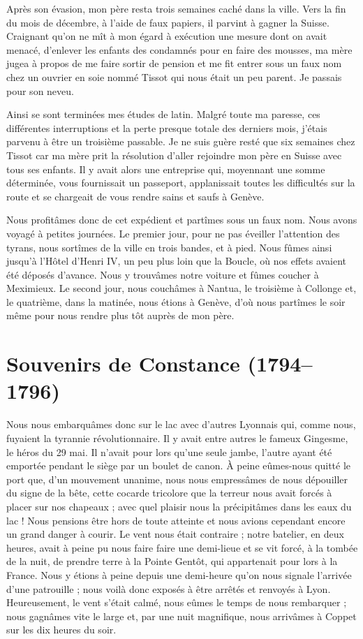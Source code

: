 \documentclass[11pt,a4paper]{report}
\begin{document}
Après son évasion, mon père resta trois semaines caché dans la ville. Vers la fin du mois de décembre, à l'aide de faux papiers, il parvint à gagner la Suisse. Craignant qu'on ne mît à mon égard à exécution une mesure dont on avait menacé, d'enlever les enfants des condamnés pour en faire des mousses, ma mère jugea à propos de me faire sortir de pension et me fit entrer sous un faux nom chez un ouvrier en soie nommé Tissot qui nous était un peu parent. Je passais pour son neveu.

Ainsi se sont terminées mes études de latin. Malgré toute ma paresse, ces différentes interruptions et la perte presque totale des derniers mois, j'étais parvenu à être un troisième passable. Je ne suis guère resté que six semaines chez Tissot car ma mère prit la résolution d'aller rejoindre mon père en Suisse avec tous ses enfants. Il y avait alors une entreprise qui, moyennant une somme déterminée, vous fournissait un passeport, applanissait toutes les difficultés sur la route et se chargeait de vous rendre sains et saufs à Genève.

Nous profitâmes donc de cet expédient et partîmes sous un faux nom. Nous avons voyagé à petites journées. Le premier jour, pour ne pas éveiller l'attention des tyrans, nous sortîmes de la ville en trois bandes, et à pied. Nous fûmes ainsi jusqu'à l'Hôtel d'Henri IV, un peu plus loin que la Boucle, où nos effets avaient été déposés d'avance. Nous y trouvâmes notre voiture et fûmes coucher à Meximieux. Le second jour, nous couchâmes à Nantua, le troisième à Collonge et, le quatrième, dans la matinée, nous étions à Genève, d'où nous partîmes le soir même pour nous rendre plus tôt auprès de mon père.

\chapter{Souvenirs de Constance (1794--1796)}

Nous nous embarquâmes donc sur le lac avec d'autres Lyonnais qui, comme nous, fuyaient la tyrannie révolutionnaire. Il y avait entre autres le fameux Gingesme, le héros du 29 mai. Il n'avait pour lors qu'une seule jambe, l'autre ayant été emportée pendant le siège par un boulet de canon. À peine eûmes-nous quitté le port que, d'un mouvement unanime, nous nous empressâmes de nous dépouiller du signe de la bête, cette cocarde tricolore que la terreur nous avait forcés à placer sur nos chapeaux ; avec quel plaisir nous la précipitâmes dans les eaux du lac ! Nous pensions être hors de toute atteinte et nous avions cependant encore un grand danger à courir. Le vent nous était contraire ; notre batelier, en deux heures, avait à peine pu nous faire faire une demi-lieue et se vit forcé, à la tombée de la nuit, de prendre terre à la Pointe Gentôt, qui appartenait pour lors à la France. Nous y étions à peine depuis une demi-heure qu'on nous signale l'arrivée d'une patrouille ; nous voilà donc exposés à être arrêtés et renvoyés à Lyon. Heureusement, le vent s'était calmé, nous eûmes le temps de nous rembarquer ; nous gagnâmes vite le large et, par une nuit magnifique, nous arrivâmes à Coppet sur les dix heures du soir.
\end{document}
